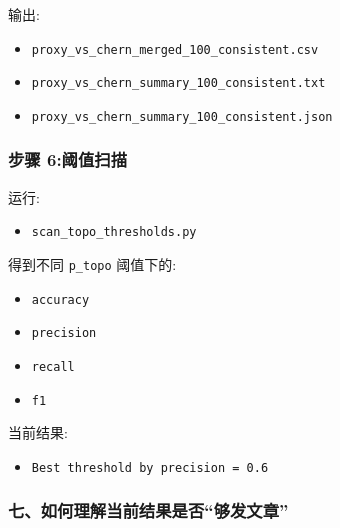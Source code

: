 \documentclass[lang=cn,scheme=chinese,color=blue,device=normal,toc=onecol,math=cm]{elegantbook}
\begin{document}
输出:\par


\begin{itemize}
\item \texttt{proxy\_\allowbreak{}vs\_\allowbreak{}chern\_\allowbreak{}merged\_\allowbreak{}100\_\allowbreak{}consistent.csv}
\item \texttt{proxy\_\allowbreak{}vs\_\allowbreak{}chern\_\allowbreak{}summary\_\allowbreak{}100\_\allowbreak{}consistent.txt}
\item \texttt{proxy\_\allowbreak{}vs\_\allowbreak{}chern\_\allowbreak{}summary\_\allowbreak{}100\_\allowbreak{}consistent.json}
\end{itemize}


\subsubsection{步骤 6:阈值扫描}


运行:\par


\begin{itemize}
\item \texttt{scan\_\allowbreak{}topo\_\allowbreak{}thresholds.py}
\end{itemize}


得到不同 \texttt{p\_\allowbreak{}topo} 阈值下的:\par


\begin{itemize}
\item \texttt{accuracy}
\item \texttt{precision}
\item \texttt{recall}
\item \texttt{f1}
\end{itemize}


当前结果:\par


\begin{itemize}
\item \texttt{Best threshold by precision = 0.6}
\end{itemize}


\subsubsection{七、如何理解当前结果是否“够发文章”}
\end{document}
